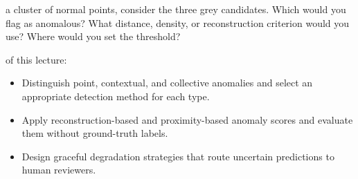 \begin{marginfigure}
\centering
{}
\caption{A cluster of normal points and three candidates marked with ``?''. Which are anomalies? On what basis would you decide?}
\label{fig:anomaly_intro}
\end{marginfigure}

 a cluster of normal points, consider the three grey candidates.
Which would you flag as anomalous?
What distance, density, or reconstruction criterion would you use?
Where would you set the threshold?

\vspace{2.5em}

 of this lecture:
\begin{itemize}
    \item Distinguish point, contextual, and collective anomalies and select an appropriate detection method for each type.
    \item Apply reconstruction-based and proximity-based anomaly scores and evaluate them without ground-truth labels.
    \item Design graceful degradation strategies that route uncertain predictions to human reviewers.
\end{itemize}



